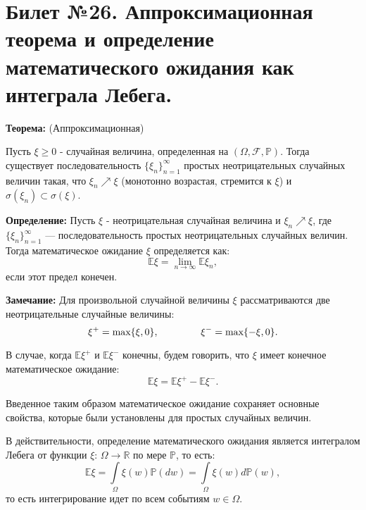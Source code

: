 \section{Билет №26. Аппроксимационная теорема и определение математического ожидания как интеграла Лебега.}

\hspace{\parindent}\textbf{Теорема:} (Аппроксимационная)
\vspace{3mm}

Пусть $\xi \geqslant 0$ - случайная величина, определенная на $(\Omega , \mathscr{F} , \mathbb{P})$. Тогда существует последовательность $\{\xi_{n}\}_{n = 1}^{\infty}$ простых неотрицательных случайных величин такая, что $\xi_{n} \nearrow \xi$ (монотонно возрастая, стремится к $\xi$) и $\sigma (\xi_{n}) \subset \sigma(\xi)$. 
\vspace{5mm}

\textbf{Определение:} Пусть $\xi$ - неотрицательная случайная величина и $\xi_{n} \nearrow \xi$, где $\{\xi_{n}\}_{n = 1}^{\infty}$ — последовательность простых неотрицательных случайных величин. Тогда математическое ожидание $\xi$ определяется как:
\begin{equation*}
	\mathbb{E}\xi = \lim\limits_{n\rightarrow\infty} \mathbb{E}\xi_{n},
\end{equation*}
\noindent если этот предел конечен.
\vspace{5mm}

\textbf{Замечание:} Для произвольной случайной величины $\xi$ рассматриваются две неотрицательные случайные величины:
\begin{equation*}
	\xi^{+} = \text{max}\{\xi, 0\}, \hspace{15mm} \xi^{-} = \text{max}\{-\xi, 0\}.
\end{equation*}

\noindent В случае, когда $\mathbb{E}\xi^{+}$ и $\mathbb{E}\xi^{-}$ конечны, будем говорить, что $\xi$ имеет конечное математическое ожидание:
\begin{equation*}
	\mathbb{E}\xi = \mathbb{E}\xi^{+} - \mathbb{E}\xi^{-}.
\end{equation*}

Введенное таким образом математическое ожидание сохраняет основные свойства, которые были установлены для простых случайных величин.

\vspace{5mm}
В действительности, определение математического ожидания является интегралом Лебега от функции $\xi$: $\Omega \rightarrow \mathbb{R}$ по мере $\mathbb{P}$, то есть:
\begin{equation*}
	\mathbb{E}\xi = \int\limits_{\Omega}\xi (w) \mathbb{P}(dw) = \int\limits_{\Omega}\xi (w) d\mathbb{P}(w),
\end{equation*}
\noindent то есть интегрирование идет по всем событиям $w \in \Omega$.


